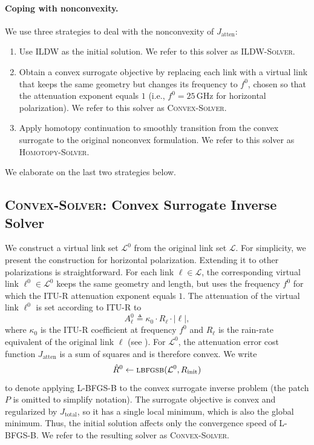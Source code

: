 \documentclass[a4paper,fleqn]{cas-sc}
\DeclareRobustCommand{\ConvexSolver}{\textsc{Convex-Solver}}
\DeclareRobustCommand{\Homotopy}{\textsc{Homotopy-Solver}}
\DeclareRobustCommand{\LBFGSB}{\textsc{lbfgsb}}
\DeclareRobustCommand{\OPTILDW}{\textsc{ILDW-Solver}}
\begin{document}
\paragraph{Coping with nonconvexity.}
We use three strategies to deal with the nonconvexity of $J_{\mathrm{atten}}$:
\begin{enumerate}
  \item Use ILDW as the initial solution. We refer to this solver as \OPTILDW.
  \item Obtain a convex surrogate objective by replacing each link with a virtual link that keeps the same geometry but changes its frequency to $f^0$, chosen so that the attenuation exponent equals $1$ (i.e., $f^0=25\,\si{\giga\hertz}$ for horizontal polarization). We refer to this solver as \ConvexSolver.
  \item Apply homotopy continuation to smoothly transition from the convex surrogate to the original nonconvex formulation. We refer to this solver as \Homotopy.
\end{enumerate}
We elaborate on the last two strategies below.

\subsection{\ConvexSolver: Convex Surrogate Inverse Solver}
We construct a virtual link set $\mathcal{L}^0$ from the original link set $\mathcal{L}$.
For simplicity, we present the construction for horizontal polarization.
Extending it to other polarizations is straightforward.
For each link $\ell\in\mathcal{L}$, the corresponding virtual link $\ell^0\in\mathcal{L}^0$ keeps the same geometry and length, but uses the frequency $f^0$ for which the ITU-R attenuation exponent equals $1$.
The attenuation of the virtual link $\ell^0$ is set according to ITU-R to
\[
  A^0_{\ell}\triangleq \kappa_0 \cdot R_{\ell}\cdot |\ell|,
\]
where $\kappa_0$ is the ITU-R coefficient at frequency $f^0$ and $R_{\ell}$ is the rain-rate equivalent of the original link $\ell$ (see ).
For $\mathcal{L}^0$, the attenuation error cost function $J_{\mathrm{atten}}$ is a sum of squares and is therefore convex.
We write
\[
  \hat{R}^0\gets \LBFGSB(\mathcal{L}^0,R_{\mathrm{init}})
\]
to denote applying L-BFGS-B to the convex surrogate inverse problem (the patch $P$ is omitted to simplify notation).
The surrogate objective is convex and regularized by $J_{\mathrm{total}}$, so it has a single local minimum, which is also the global minimum.
Thus, the initial solution affects only the convergence speed of L-BFGS-B.
We refer to the resulting solver as \ConvexSolver.
\end{document}
